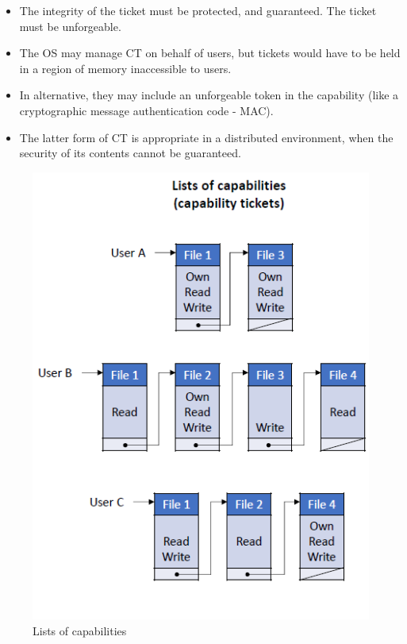 \documentclass{article}
\begin{document}
                        \begin{itemize}
                            \item The integrity of the ticket must be protected, and guaranteed. The ticket must be unforgeable.
                            \item The OS may manage CT on behalf of users, but tickets would have to be held in a region of memory inaccessible to users.
                            \item In alternative, they may include an unforgeable token in the capability (like a cryptographic message authentication code - MAC).
                            \item The latter form of CT is appropriate in a distributed environment, when the security of its contents cannot be guaranteed.
                        \end{itemize}

                        \begin{figure}[h]
                            \begin{center}
                                \includegraphics[scale=0.5]{../immagini/CT.png}
                            \end{center}
                            \caption{Lists of capabilities}
                        \end{figure}
\end{document}
